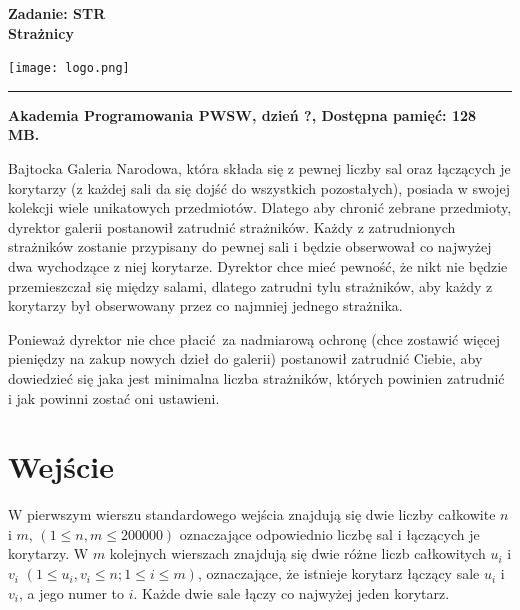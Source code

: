 \documentclass[10pt]{article}
\begin{document}
    

    \noindent
    \begin{minipage}{0.5\textwidth}
        \LARGE{\textsf{\textbf{Zadanie: STR\\Strażnicy}}}
    \end{minipage}
    \begin{minipage}{0.5\textwidth}
        \begin{flushright}
            \texttt{[image: logo.png]}
        \end{flushright}
    \end{minipage}
    
    \noindent\rule{\textwidth}{0.4pt}
    
    \noindent\textbf{Akademia Programowania PWSW, dzień ?, Dostępna pamięć: 128 MB.}
    \vspace{1em}
    
    
    \noindent
    Bajtocka Galeria Narodowa, która składa się z pewnej liczby sal oraz łączących je korytarzy (z każdej sali da się dojść do wszystkich pozostałych), posiada w swojej kolekcji wiele unikatowych przedmiotów. Dlatego aby chronić zebrane przedmioty, dyrektor galerii postanowił zatrudnić strażników. Każdy z zatrudnionych strażników zostanie przypisany do pewnej sali i będzie obserwował co najwyżej dwa wychodzące z niej korytarze. Dyrektor chce mieć pewność, że nikt nie będzie przemieszczał się między salami, dlatego zatrudni tylu strażników, aby każdy z korytarzy był obserwowany przez co najmniej jednego strażnika.
    
    Ponieważ dyrektor nie chce płacić za nadmiarową ochronę (chce zostawić więcej pieniędzy na zakup nowych dzieł do galerii) postanowił zatrudnić Ciebie, aby dowiedzieć się jaka jest minimalna liczba strażników, których powinien zatrudnić i jak powinni zostać oni ustawieni.


    \section*{Wejście}
    
    W pierwszym wierszu standardowego wejścia znajdują się dwie liczby całkowite $n$ i $m$, $(1\leq n, m\leq 200000)$ oznaczające odpowiednio liczbę sal i łączących je korytarzy. W $m$ kolejnych wierszach znajdują się dwie różne liczb całkowitych $u_{i}$ i $v_{i}$ $(1\leq u_{i}, v_{i}\leq n; 1\leq i\leq m)$, oznaczające, że istnieje korytarz łączący sale $u_{i}$ i $v_{i}$, a jego numer to $i$. Każde dwie sale łączy co najwyżej jeden korytarz.
\end{document}
